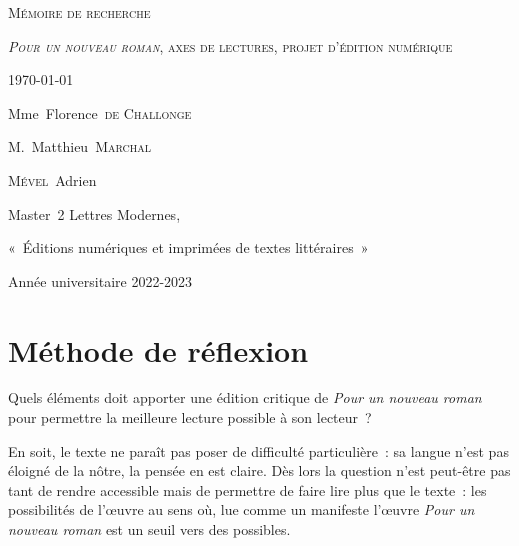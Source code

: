\documentclass[12pt, a4paper]{article}
\begin{document}


\begin{titlepage}
  

\vspace*{3cm}

 
\begin{center}
\textsc{\huge Mémoire de recherche}

\textsc{\textit{Pour un nouveau roman}, axes de lectures, projet d'édition numérique}



\today


\vspace*{2cm}
Mme~Florence~\textsc{de Challonge}


M.~Matthieu~\textsc{Marchal}




\vspace*{11cm}
\small
\textsc{Mével}~Adrien

Master~2 Lettres Modernes,

«~Éditions numériques et imprimées de textes littéraires~»

\vspace*{2.5cm}
Année universitaire 2022-2023




\end{center}


\end{titlepage}	

\begin{center}
\end{center}
\vspace{3cm}
\newcommand{\punr}{\textit{Pour un nouveau roman}}
\newcommand{\robbe}{Alain~Robbe-Grillet}

\section{Méthode de réflexion}

Quels éléments doit apporter une édition critique de \punr{} pour permettre la meilleure lecture possible à son lecteur~? 

En soit, le texte ne paraît pas poser de difficulté particulière~: sa langue n'est pas éloigné de la nôtre, la pensée en est claire. Dès lors la question n'est peut-être pas tant de rendre accessible mais de permettre de faire lire plus que le texte~: les possibilités de l'œuvre au sens où, lue comme un manifeste l'œuvre \punr{} est un seuil vers des possibles.
\end{document}
